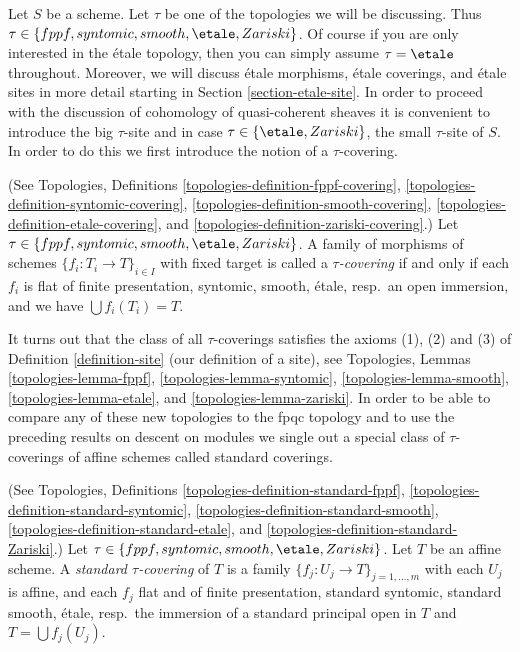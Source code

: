 \noindent
Let $S$ be a scheme.
Let $\tau$ be one of the topologies we will be discussing.
Thus $\tau \in \{fppf, syntomic, smooth, \etale, Zariski\}$.
Of course if you are only interested in the \'etale topology, then
you can simply assume $\tau = \etale$ throughout. Moreover, we will
discuss \'etale morphisms, \'etale coverings, and \'etale sites
in more detail starting in Section \ref{section-etale-site}.
In order to proceed with the discussion of cohomology of
quasi-coherent sheaves it is convenient to introduce the
big $\tau$-site and in case $\tau \in \{\etale, Zariski\}$, the
small $\tau$-site of $S$. In order to do this we first introduce
the notion of a $\tau$-covering.

\begin{definition}
\label{definition-tau-covering}
(See
Topologies, Definitions
\ref{topologies-definition-fppf-covering},
\ref{topologies-definition-syntomic-covering},
\ref{topologies-definition-smooth-covering},
\ref{topologies-definition-etale-covering}, and
\ref{topologies-definition-zariski-covering}.)
Let $\tau \in \{fppf, syntomic, smooth, \etale, Zariski\}$.
A family of morphisms of schemes $\{f_i : T_i \to T\}_{i \in I}$ with fixed
target is called a {\it $\tau$-covering} if and only if
each $f_i$ is flat of finite presentation, syntomic, smooth, \'etale,
resp.\ an open immersion, and we have $\bigcup f_i(T_i) = T$.
\end{definition}

\noindent
It turns out that the class of all $\tau$-coverings satisfies the axioms
(1), (2) and (3) of
Definition \ref{definition-site} (our definition of a site), see
Topologies, Lemmas
\ref{topologies-lemma-fppf},
\ref{topologies-lemma-syntomic},
\ref{topologies-lemma-smooth},
\ref{topologies-lemma-etale}, and
\ref{topologies-lemma-zariski}.
In order to be able to compare any of these new topologies to the fpqc topology
and to use the preceding results on descent on modules we single out a special
class of $\tau$-coverings of affine schemes called standard coverings.

\begin{definition}
\label{definition-standard-tau}
(See
Topologies, Definitions
\ref{topologies-definition-standard-fppf},
\ref{topologies-definition-standard-syntomic},
\ref{topologies-definition-standard-smooth},
\ref{topologies-definition-standard-etale}, and
\ref{topologies-definition-standard-Zariski}.)
Let $\tau \in \{fppf, syntomic, smooth, \etale, Zariski\}$.
Let $T$ be an affine scheme.
A {\it standard $\tau$-covering} of $T$ is a family
$\{f_j : U_j \to T\}_{j = 1, \ldots, m}$ with each $U_j$ is affine,
and each $f_j$ flat and of finite presentation,
standard syntomic, standard smooth, \'etale, resp.\ the immersion of a
standard principal open in $T$ and $T = \bigcup f_j(U_j)$.
\end{definition}

